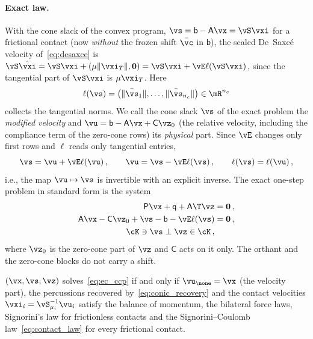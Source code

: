 \paragraph{Exact law.} With the cone slack of the convex program, $\vs = \mathsf{b} - \mathsf{A}\vx = \vS \vxi$ for a frictional contact (now \emph{without} the frozen shift $\bar{\vc}$ in $\mathsf{b}$), the scaled De~Saxc\'e velocity of~\eqref{eq:desaxce} is $\vS \hat{\vxi} = \vS\vxi + (\mu\|\vxi_T\|, \mathbf{0}) = \vS\vxi + \vE\ell(\vS\vxi)$, since the tangential part of $\vS\vxi$ is $\mu\vxi_T$. Here
%
\begin{equation}\label{eq:ec_ell}
	\ell(\vs) = \big(\|\bar{\vs}_1\|, \dots, \|\bar{\vs}_{n_c}\|\big) \in \mR^{n_c}
\end{equation}
%
collects the tangential norms. We call the cone slack $\vs$ of the exact problem the \emph{modified velocity} and $\vu = \mathsf{b} - \mathsf{A}\vx + \mathsf{C}\vz_0$ (the relative velocity, including the compliance term of the zero-cone rows) its \emph{physical} part. Since $\vE$ changes only first rows and $\ell$ reads only tangential entries,
%
\begin{equation}\label{eq:ec_phi}
	\vs = \vu + \vE\ell(\vu) \, , \qquad \vu = \vs - \vE \ell(\vs) \, , \qquad \ell(\vs) = \ell(\vu) \, ,
\end{equation}
%
i.e., the map $\vu \mapsto \vs$ is invertible with an explicit inverse. The exact one-step problem in standard form is the system
%
\begin{subequations}\label{eq:ec_ccp}
	\begin{align}
		\mathsf{P}\vx + \mathsf{q} + \mathsf{A}\T\vz &= \mathbf{0} \, , \label{eq:ec_ccp_dual} \\
		\mathsf{A}\vx - \mathsf{C}\vz_0 + \vs - \mathsf{b} - \vE\ell(\vs) &= \mathbf{0} \, , \label{eq:ec_ccp_primal} \\
		\cK \ni \vs \perp \vz \in \cK \, , \label{eq:ec_ccp_compl}
	\end{align}
\end{subequations}
%
where $\vz_0$ is the zero-cone part of $\vz$ and $\mathsf{C}$ acts on it only. The orthant and the zero-cone blocks do not carry a shift.
%
\begin{proposition}\label{prop:ec_equivalence}
	$(\vx, \vs, \vz)$ solves~\eqref{eq:ec_ccp} if and only if $\vu_\none = \vx$ (the velocity part), the percussions recovered by~\eqref{eq:conic_recovery} and the contact velocities $\vxi_i = \vS_{\mu_i}^{-1} \vu_i$ satisfy the balance of momentum, the bilateral force laws, Signorini's law for frictionless contacts and the Signorini--Coulomb law~\eqref{eq:contact_law} for every frictional contact.
\end{proposition}
